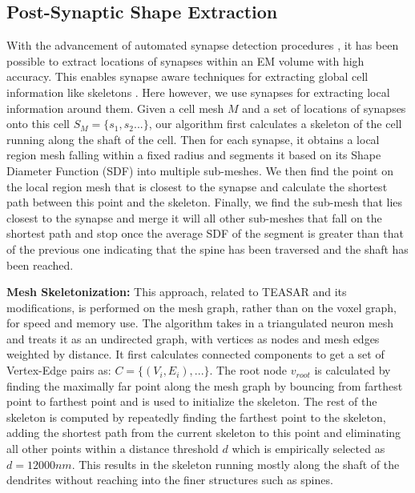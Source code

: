 \documentclass[runningheads]{llncs}
\begin{document}
\noindent \subsection{\textbf{Post-Synaptic Shape Extraction}}
With the advancement of automated synapse detection procedures \cite{synapsedetection}, it has been possible to extract locations of synapses within an EM volume with high accuracy. This enables synapse aware techniques for extracting global cell information like skeletons \cite{matejek2019synapseaware}. Here however, we use synapses for extracting local information around them. 
Given a cell mesh $M$ and a set of locations of synapses onto this cell $S_M = \{ s_1,s_2 ...\}$,  our algorithm first calculates a skeleton of the cell running along the shaft of the cell. Then for each synapse, it obtains a local region mesh falling within a fixed radius and segments it based on its Shape Diameter Function (SDF) into multiple sub-meshes. We then find the point on the local region mesh that is closest to the synapse and calculate the shortest path between this point and the skeleton. Finally, we find the sub-mesh that lies closest to the synapse and merge it will all other sub-meshes that fall on the shortest path and stop once the average SDF of the segment is greater than that of the previous one indicating that the spine has been traversed and the shaft has been reached. 


\noindent\textbf{Mesh Skeletonization:} This approach, related to TEASAR \cite{883951} and its modifications, is performed on the mesh graph, rather than on the voxel graph, for speed and memory use. The algorithm takes in a triangulated neuron mesh and treats it as an undirected graph, with vertices as nodes and mesh edges weighted by distance. It first calculates connected components to get a set of Vertex-Edge pairs as: $C = \{(V_i,E_i),... \}$.  The root node $v_{root}$ is calculated by finding the maximally far point along the mesh graph by bouncing from farthest point to farthest point and is used to initialize the skeleton. The rest of the skeleton is computed by repeatedly finding the farthest point to the skeleton, adding the shortest path from the current skeleton to this point and eliminating all other points within a distance threshold $d$ which is empirically selected as $d = 12000 nm$. This results in the skeleton running mostly along the shaft of the dendrites without reaching into the finer structures such as spines.  
\end{document}
